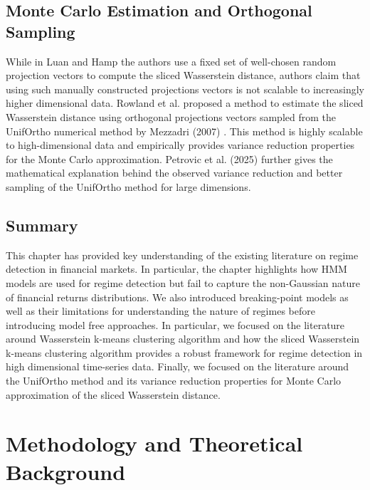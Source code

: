 \documentclass[12pt,a4paper]{report}
\begin{document}
\section{Monte Carlo Estimation and Orthogonal Sampling}
While in Luan and Hamp \cite{LuanHamp2025} the authors use a fixed set of well-chosen random projection vectors to compute the sliced Wasserstein distance, authors claim that using such manually constructed projections vectors is not scalable to increasingly higher dimensional data.
Rowland et al. \cite{RowlandEtAl2019} proposed a method to estimate the sliced Wasserstein distance using orthogonal projections vectors sampled from the UnifOrtho numerical method by  Mezzadri (2007) \cite{Mezzadri2007}. This method is highly scalable to high-dimensional data and empirically provides variance reduction properties for the Monte Carlo approximation.
Petrovic et al. (2025) \cite{PetrovicBardenetDesolneux2025} further gives the mathematical explanation behind the observed variance reduction and better sampling of the UnifOrtho method for large dimensions.


\section{Summary}
This chapter has provided key understanding of the existing literature on regime detection in financial markets.
In particular, the chapter highlights how HMM models are used for regime detection but fail to capture the non-Gaussian nature of financial returns distributions.
We also introduced breaking-point models as well as their limitations for understanding the nature of regimes before introducing model free approaches. 
In particular, we focused on the literature around Wasserstein k-means clustering algorithm and how the sliced Wasserstein k-means clustering algorithm provides a robust framework for regime detection in high dimensional time-series data.
Finally, we focused on the literature around the UnifOrtho method and its variance reduction properties for Monte Carlo approximation of the sliced Wasserstein distance.













\chapter{Methodology and Theoretical Background}
\end{document}
